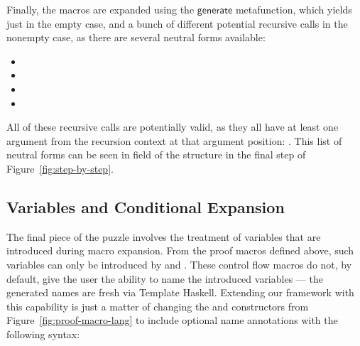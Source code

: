 Finally, the  macros are expanded using the
$\mathsf{generate}$ metafunction, which yields just  in
the empty case, and a bunch of different potential recursive calls in
the nonempty case, as there are several neutral forms available:
\begin{itemize}
  \item {}
  \item {}
  \item {}
  \item {}
\end{itemize}
All of these recursive calls are potentially valid, as they all have
at least one argument from the recursion context at that argument
position: .  This list of neutral forms can be seen in
 field of the  structure in the final step of
Figure~\ref{fig:step-by-step}.


\subsection{Variables and Conditional Expansion}
\label{sec:cond-expand}

The final piece of the puzzle involves the treatment of variables that
are introduced during macro expansion. From the proof macros defined
above, such variables can only be introduced by  and
. These control flow macros do not, by default, give the
user the ability to name the introduced variables --- the generated
names are fresh via Template Haskell. Extending our framework with
this capability is just a matter of changing the  and
 constructors from Figure~\ref{fig:proof-macro-lang}
to include optional name annotations with the following syntax:

